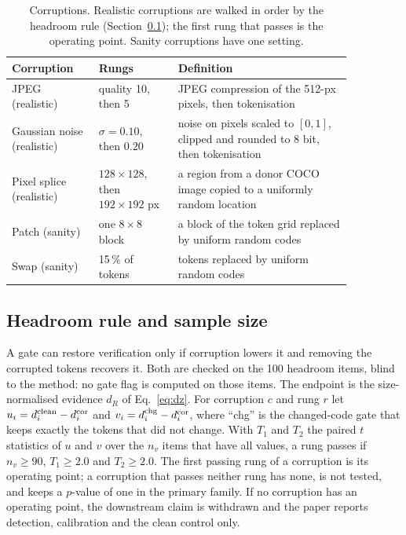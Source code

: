 \begin{table}[t]
\centering
\caption{Corruptions. Realistic corruptions are walked in order by the headroom rule (Section~\ref{ssec:headroom}); the first
rung that passes is the operating point. Sanity corruptions have one setting.}
\label{tab:corruptions}
\small
\begin{tabular}{p{0.22\linewidth}p{0.2\linewidth}p{0.44\linewidth}}
\toprule
Corruption & Rungs & Definition \\
\midrule
JPEG (realistic) & quality 10, then 5 & JPEG compression of the 512-px pixels, then tokenisation \\
Gaussian noise (realistic) & $\sigma=0.10$, then $0.20$ & noise on pixels scaled to $[0,1]$, clipped and rounded to 8 bit, then tokenisation \\
Pixel splice (realistic) & $128\times128$, then $192\times192$ px & a region from a donor COCO image copied to a uniformly random location \\
Patch (sanity) & one $8\times8$ block & a block of the token grid replaced by uniform random codes \\
Swap (sanity) & 15\,\% of tokens & tokens replaced by uniform random codes \\
\bottomrule
\end{tabular}
\end{table}

\subsection{Headroom rule and sample size}\label{ssec:headroom}
A gate can restore verification only if corruption lowers it and removing the corrupted tokens recovers it.
Both are checked on the 100 headroom items, blind to the method: no gate flag is computed on those items.
The endpoint is the size-normalised evidence $d_R$ of Eq.~\eqref{eq:dz}.
For corruption $c$ and rung $r$ let $u_i=d^{\rm clean}_i-d^{\rm cor}_i$ and $v_i=d^{\rm chg}_i-d^{\rm cor}_i$, where
``chg'' is the changed-code gate that keeps exactly the tokens that did not change.
With $T_1$ and $T_2$ the paired $t$ statistics of $u$ and $v$ over the $n_v$ items that have all values, a rung passes if
$n_v\ge90$, $T_1\ge2.0$ and $T_2\ge2.0$.
The first passing rung of a corruption is its operating point; a corruption that passes neither rung has none, is not tested,
and keeps a $p$-value of one in the primary family.
If no corruption has an operating point, the downstream claim is withdrawn and the paper reports detection, calibration and the
clean control only.

